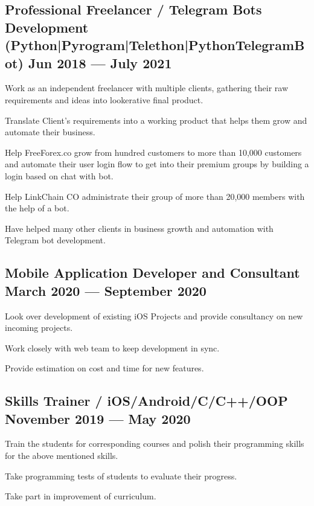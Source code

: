\documentclass[letter,10pt]{article}
\begin{document}
\subsection{{Professional Freelancer / Telegram Bots Development (Python|Pyrogram|Telethon|PythonTelegramBot) \hfill Jun 2018 --- July 2021}}
\begin{zitemize}
\item Work as an independent freelancer with multiple clients, gathering their raw requirements and ideas into lookerative final product.
\item Translate Client's requirements into a working product that helps them grow and automate their business.
\item Help FreeForex.co grow from hundred customers to more than 10,000 customers and automate their user login flow to get into their premium groups by building a login based on chat with bot.
\item Help LinkChain CO administrate their group of more than 20,000 members with the help of a bot.
\item Have helped many other clients in business growth and automation with Telegram bot development.
\end{zitemize}

\subsection{{Mobile Application Developer and Consultant \hfill March 2020 --- September 2020}}
\begin{zitemize}
\item Look over development of existing iOS Projects and provide consultancy on new incoming projects.
\item Work closely with web team to keep development in sync.
\item Provide estimation on cost and time for new features.
\end{zitemize}

\subsection{{Skills Trainer / iOS/Android/C/C++/OOP \hfill November 2019 --- May 2020}}
\begin{zitemize}
\item Train the students for corresponding courses and polish their programming skills for the above mentioned skills.
\item Take programming tests of students to evaluate their progress.
\item Take part in improvement of curriculum.
\end{zitemize}
\end{document}
